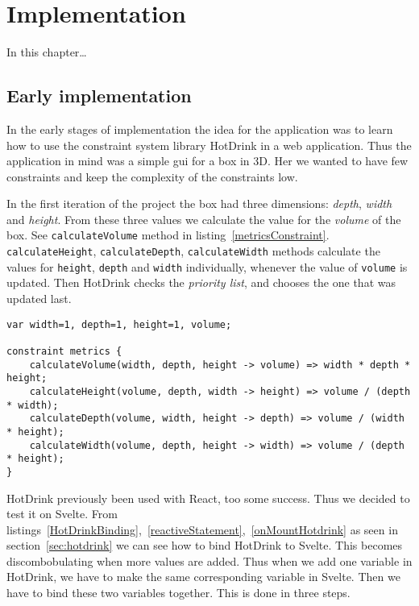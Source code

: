 \chapter{Implementation}

In this chapter…

\section{Early implementation}

In the early stages of implementation the idea for the application was to learn how 
to use the constraint system library HotDrink in a web application. Thus the 
application in mind was a simple \gls{gui} for a box in 3D. Her we wanted to have few 
constraints and keep the complexity of the constraints low. 

In the first iteration of the project the box had three dimensions: \textit{depth}, 
\textit{width} and \textit{height}. From these three values we calculate the value 
for the \textit{volume} of the box. See \texttt{calculateVolume} method in 
listing~\ref{metricsConstraint}. \texttt{calculateHeight}, \texttt{calculateDepth}, 
\texttt{calculateWidth} methods calculate the values for \texttt{height}, 
\texttt{depth} and \texttt{width} individually, whenever the value of \texttt{volume} 
is updated. Then HotDrink checks the \textit{priority list}, and chooses the one that 
was updated last.

\begin{lstlisting}[caption={Example of the constraint calculating the values of the box},label=metricsConstraint, language=hotdrink]
var width=1, depth=1, height=1, volume;

constraint metrics {
    calculateVolume(width, depth, height -> volume) => width * depth * height;
    calculateHeight(volume, depth, width -> height) => volume / (depth * width);
    calculateDepth(volume, width, height -> depth) => volume / (width * height);
    calculateWidth(volume, depth, height -> width) => volume / (depth * height);
}
\end{lstlisting}

HotDrink previously been used with React, too some success. Thus we decided to test it 
on Svelte. 
From listings~\ref{HotDrinkBinding},~\ref{reactiveStatement},~\ref{onMountHotdrink} 
as seen in section~\ref{sec:hotdrink} we can see how to bind HotDrink to Svelte. This 
becomes discombobulating when more values are added. Thus when we add one variable in 
HotDrink, we have to make the same corresponding variable in Svelte. Then we have to 
bind these two variables together. This is done in three steps. 

